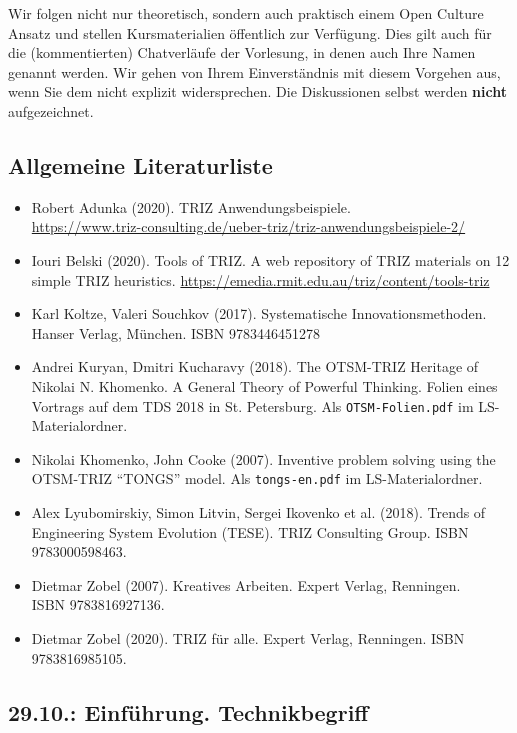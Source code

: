 \documentclass[11pt,a4paper]{article}
\begin{document}
Wir folgen nicht nur theoretisch, sondern auch praktisch einem Open Culture
Ansatz und stellen Kursmaterialien öffentlich zur Verfügung.  Dies gilt auch
für die (kommentierten) Chatverläufe der Vorlesung, in denen auch Ihre Namen
genannt werden.  Wir gehen von Ihrem Einverständnis mit diesem Vorgehen aus,
wenn Sie dem nicht explizit widersprechen.  Die Diskussionen selbst werden
\textbf{nicht} aufgezeichnet.

\subsection{Allgemeine Literaturliste}
\begin{itemize}[noitemsep]
\item Robert Adunka (2020). TRIZ Anwendungsbeispiele. \\
  \url{https://www.triz-consulting.de/ueber-triz/triz-anwendungsbeispiele-2/} 
\item Iouri Belski (2020). Tools of TRIZ. A web repository of TRIZ materials
  on 12 simple TRIZ heuristics.
  \url{https://emedia.rmit.edu.au/triz/content/tools-triz}
\item Karl Koltze, Valeri Souchkov (2017). Systematische Innovationsmethoden.
  Hanser Verlag, München. ISBN 9783446451278
\item Andrei Kuryan, Dmitri Kucharavy (2018). The OTSM-TRIZ Heritage of
  Nikolai N. Khomenko. A General Theory of Powerful Thinking. Folien eines
  Vortrags auf dem TDS 2018 in St. Petersburg. Als \texttt{OTSM-Folien.pdf} im
  LS-Materialordner.
\item Nikolai Khomenko, John Cooke (2007). Inventive problem solving using the
  OTSM-TRIZ “TONGS” model.  Als \texttt{tongs-en.pdf} im LS-Materialordner.
\item Alex Lyubomirskiy, Simon Litvin, Sergei Ikovenko et al. (2018). Trends
  of Engineering System Evolution (TESE).  TRIZ Consulting Group. ISBN
  9783000598463.
\item Dietmar Zobel (2007). Kreatives Arbeiten. Expert Verlag, Renningen.\\
  ISBN 9783816927136.
\item Dietmar Zobel (2020). TRIZ für alle. Expert Verlag, Renningen. ISBN
  9783816985105.
\end{itemize}

\subsection{29.10.: Einführung. Technikbegriff}
\end{document}
